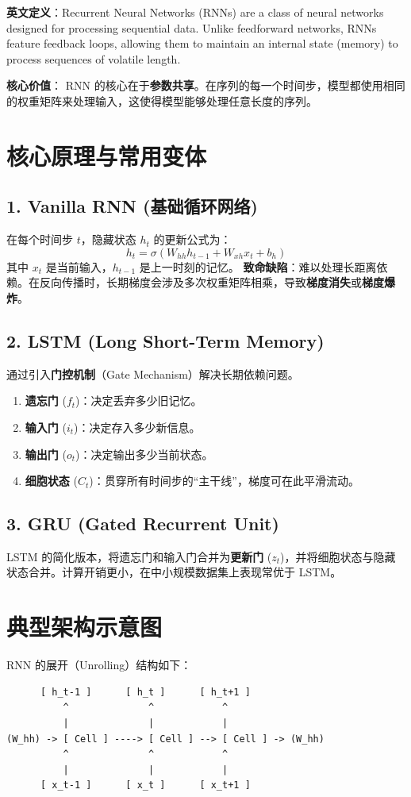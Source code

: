 \documentclass[12pt, a4paper]{book}
\begin{document}
\textbf{英文定义}：Recurrent Neural Networks (RNNs) are a class of neural networks designed for processing sequential data. Unlike feedforward networks, RNNs feature feedback loops, allowing them to maintain an internal state (memory) to process sequences of volatile length.

\textbf{核心价值}：
RNN 的核心在于\textbf{参数共享}。在序列的每一个时间步，模型都使用相同的权重矩阵来处理输入，这使得模型能够处理任意长度的序列。

\section{核心原理与常用变体}

\subsection{1. Vanilla RNN (基础循环网络)}
在每个时间步 $t$，隐藏状态 $h_t$ 的更新公式为：
$$ h_t = \sigma(W_{hh} h_{t-1} + W_{xh} x_t + b_h) $$
其中 $x_t$ 是当前输入，$h_{t-1}$ 是上一时刻的记忆。
\textbf{致命缺陷}：难以处理长距离依赖。在反向传播时，长期梯度会涉及多次权重矩阵相乘，导致\textbf{梯度消失}或\textbf{梯度爆炸}。

\subsection{2. LSTM (Long Short-Term Memory)}
通过引入\textbf{门控机制}（Gate Mechanism）解决长期依赖问题。
\begin{enumerate}
    \item \textbf{遗忘门} ($f_t$)：决定丢弃多少旧记忆。
    \item \textbf{输入门} ($i_t$)：决定存入多少新信息。
    \item \textbf{输出门} ($o_t$)：决定输出多少当前状态。
    \item \textbf{细胞状态} ($C_t$)：贯穿所有时间步的“主干线”，梯度可在此平滑流动。
\end{enumerate}

\subsection{3. GRU (Gated Recurrent Unit)}
LSTM 的简化版本，将遗忘门和输入门合并为\textbf{更新门} ($z_t$)，并将细胞状态与隐藏状态合并。计算开销更小，在中小规模数据集上表现常优于 LSTM。

\section{典型架构示意图}
RNN 的展开（Unrolling）结构如下：
\begin{verbatim}
      [ h_t-1 ]      [ h_t ]      [ h_t+1 ]
          ^              ^            ^
          |              |            |
(W_hh) -> [ Cell ] ----> [ Cell ] --> [ Cell ] -> (W_hh)
          ^              ^            ^
          |              |            |
      [ x_t-1 ]      [ x_t ]      [ x_t+1 ]
\end{verbatim}
\end{document}
